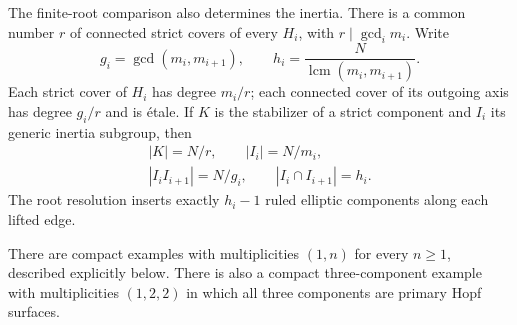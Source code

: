 \begin{proposition}
The finite-root comparison also determines the
inertia. There is a common number $r$ of connected
strict covers of every $H_i$, with
$r\mid\gcd_i m_i$. Write
\[
 g_i=\gcd(m_i,m_{i+1}),\qquad
 h_i=\frac{N}{\operatorname{lcm}(m_i,m_{i+1})}.
\]
Each strict cover of $H_i$ has degree $m_i/r$;
each connected cover of its outgoing axis has
degree $g_i/r$ and is \'{e}tale. If $K$ is the
stabilizer of a strict component and $I_i$
its generic inertia subgroup, then
\[
 \begin{gathered}
 |K|=N/r,\qquad |I_i|=N/m_i,\\
 |I_iI_{i+1}|=N/g_i,\qquad
 |I_i\cap I_{i+1}|=h_i.
 \end{gathered}
\tag{C.WH.0}\label{cdp:eq:C.WH.0}
\]
The root resolution inserts exactly $h_i-1$
ruled elliptic components along each lifted edge.

There are compact examples with multiplicities
$(1,n)$ for every $n\ge1$, described explicitly
below. There is also a compact three-component
example with multiplicities $(1,2,2)$ in which
all three components are primary Hopf surfaces.
\end{proposition}

